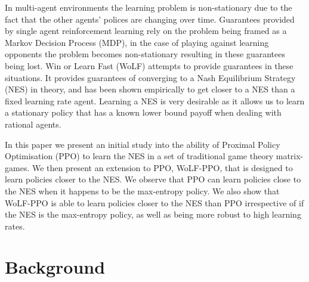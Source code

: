 \documentclass[conference]{IEEEtran}
\newcommand\REVIEW[1]{{\color{blue} #1}}
\begin{document}
In multi-agent environments the learning problem is non-stationary due to the fact that the other agents' polices are changing over time.
\REVIEW{Guarantees provided by single agent reinforcement learning rely on the problem being framed as a Markov Decision Process (MDP), in the case of playing against learning opponents the problem becomes non-stationary resulting in these guarantees being lost.}
Win or Learn Fast (WoLF) attempts to provide guarantees in these situations\cite{bowling2002multiagent}. It provides guarantees of converging to a Nash Equilibrium Strategy (NES) in theory, and has been shown empirically to get closer to a NES than a fixed learning rate agent. Learning a NES is very desirable as it allows us to learn a stationary policy that has a known lower bound payoff when dealing with rational agents.

In this paper we present an initial study into the ability of Proximal Policy Optimisation (PPO) to learn the NES in a set of traditional game theory matrix-games. We then present an extension to PPO, WoLF-PPO, that is designed to learn policies closer to the NES. We observe that PPO can learn policies close to the NES when it happens to be the max-entropy policy. We also show that WoLF-PPO is able to learn policies closer to the NES than PPO irrespective of if the NES is the max-entropy policy, as well as being more robust to high learning rates.

\section{Background}


\end{document}

